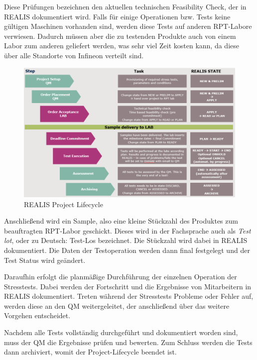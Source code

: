Diese Prüfungen bezeichnen den aktuellen technischen Feasibility Check, der in \gls{REALIS} dokumentiert wird.
Falls für einige Operationen bzw. Tests keine gültigen Maschinen vorhanden sind, werden diese Tests auf anderen \gls{RPT}-Labore verwiesen. Dadurch müssen aber die zu testenden Produkte auch von einem Labor zum anderen geliefert werden, was sehr viel Zeit kosten kann, da diese über alle Standorte von Infineon verteilt sind.

\begin{figure}[!h]
    \centering
    \includegraphics[width=1\textwidth]{bilder/realis-project-lifecycle.png}
    \caption{REALIS Project Lifecycle}
    \label{fig:realis-project-lifecycle}
\end{figure}

Anschließend wird ein Sample, also eine kleine Stückzahl des Produktes zum beauftragten \gls{RPT}-Labor geschickt. Dieses wird in der Fachsprache auch als \textit{Test \gls{lot}}, oder zu Deutsch: Test-Los 
bezeichnet. Die Stückzahl wird dabei in \gls{REALIS} dokumentiert. Die  Daten der Testoperation werden dann final festgelegt und der Test Status wird geändert.

Daraufhin erfolgt die planmäßige Durchführung der einzelnen Operation der Stresstests. Dabei werden der Fortschritt und die Ergebnisse von Mitarbeitern in \gls{REALIS} dokumentiert. Treten während der Stresstests Probleme oder Fehler auf, werden diese an den \gls{QM} weitergeleitet, der anschließend über das weitere Vorgehen entscheidet.

Nachdem alle Tests vollständig durchgeführt und dokumentiert worden sind, muss der \gls{QM} die Ergebnisse prüfen und bewerten. Zum Schluss werden die Tests dann archiviert, womit der Project-Lifecycle beendet ist.


